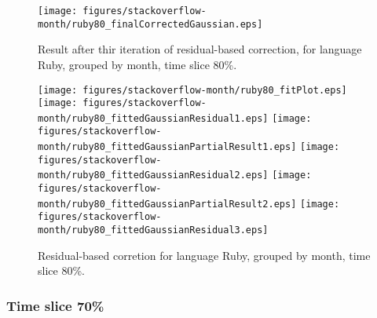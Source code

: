 \begin{figure}[]
\centering
{\texttt{[image: figures/stackoverflow-month/ruby80\_finalCorrectedGaussian.eps]}}
\caption{Result after thir iteration of residual-based correction, for language Ruby, grouped by month, time slice 80\%.}
\end{figure}


\begin{figure}[hb]
\centering
{}
{\texttt{[image: figures/stackoverflow-month/ruby80\_fitPlot.eps]}}
{\texttt{[image: figures/stackoverflow-month/ruby80\_fittedGaussianResidual1.eps]}}
{\texttt{[image: figures/stackoverflow-month/ruby80\_fittedGaussianPartialResult1.eps]}}
{\texttt{[image: figures/stackoverflow-month/ruby80\_fittedGaussianResidual2.eps]}}
{\texttt{[image: figures/stackoverflow-month/ruby80\_fittedGaussianPartialResult2.eps]}}
{\texttt{[image: figures/stackoverflow-month/ruby80\_fittedGaussianResidual3.eps]}}
\caption{Residual-based corretion for language Ruby, grouped by month, time slice 80\%.}
\end{figure}


\clearpage 
\newpage 


\FloatBarrier

\subsubsection{Time slice 70\%}


